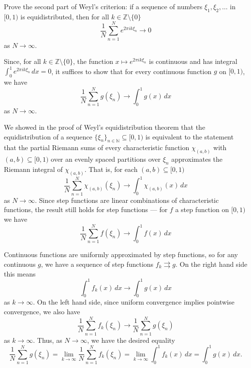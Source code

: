 \documentclass[12 pt, letterpaper]{hmcpset}
\begin{document}
\begin{problem}[S \& S \S 4.5 \#7.]
	Prove the second part of Weyl's criterion: if a sequence of numbers $\xi_{1}, \xi_{2}, \dots$ in $[0, 1)$ is equidistributed, then for all $k \in \mathbb{Z} \setminus \{ 0 \}$ 
	\[
		\frac{1}{N} \sum_{n = 1}^{N} e^{2 \pi i k \xi_{n}} \to 0
	\]
	as $N \to \infty$.
\end{problem}

\begin{solution}
	Since, for all $k \in \mathbb{Z} \setminus \{ 0 \}$, the function $x \mapsto e^{2 \pi i k \xi_{n}}$ is continuous and has integral $\int_{0}^{1} e^{2 \pi i k \xi_{n}} \, dx = 0$, it suffices to show that for every continuous function $g$ on $[0, 1)$, we have
	\[
		\frac{1}{N} \sum_{n = 1}^{N} g(\xi_{n}) \to \int_{0}^{1} g(x) \, dx 
	\]
	as $N \to \infty$.

	We showed in the proof of Weyl's equidistribution theorem that the equidistribution of a sequence $\{ \xi_{n} \}_{n \in \mathbb{N}} \subseteq [0, 1)$ is equivalent to the statement that the partial Riemann sums of every characteristic function $\chi_{(a, b)}$ with $(a, b) \subseteq [0, 1)$ over an evenly spaced partitions over $\xi_{n}$ approximates the Riemann integral of $\chi_{(a, b)}$. That is, for each $(a, b) \subseteq [0, 1)$
	\[
		\frac{1}{N} \sum_{n = 1}^{N} \chi_{(a, b)}(\xi_{n}) \to \int_{0}^{1} \chi_{(a, b)}(x) \, dx 
	\]
	as $N \to \infty$. Since step functions are linear combinations of characteristic functions, the result still holds for step functions --- for $f$ a step function on $[0, 1)$ we have
	\[
		\frac{1}{N} \sum_{n = 1}^{N} f(\xi_{n}) \to \int_{0}^{1} f(x) \, dx
	\]

	Continuous functions are uniformly approximated by step functions, so for any continuous $g$, we have a sequence of step functions $f_{k} \rightrightarrows g$. On the right hand side this means
	\[
		\int_{0}^{1} f_{k}(x) \, dx \to \int_{0}^{1} g(x) \, dx 
	\]
	as $k \to \infty$. On the left hand side, since uniform convergence implies pointwise convergence, we also have
	\[
		\frac{1}{N} \sum_{n = 1}^{N} f_{k}(\xi_{n}) \to \frac{1}{N} \sum_{n = 1}^{N} g(\xi_{n})
	\]
	as $k \to \infty$. Thus, as $N \to \infty$, we have the desired equality
	\[
		\frac{1}{N} \sum_{n = 1}^{N} g(\xi_{n}) = \lim_{k \to \infty} \frac{1}{N} \sum_{n = 1}^{N} f_{k}(\xi_{n}) = \lim_{k \to \infty} \int_{0}^{1} f_{k}(x) \, dx = \int_{0}^{1} g(x) \, dx.
	\]
\end{solution}
\end{document}
